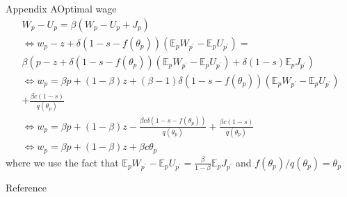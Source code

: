 \documentclass{beamer}
\begin{document}
\begin{frame}{Appendix A}{Optimal wage}\label{OptWage}
    \begin{gather*}
        W_p - U_p = \beta (W_p - U_p + J_p)\\
        \Leftrightarrow
        w_p - z + \delta (1-s-f(\theta_p))(\mathbb{E}_p W_{p^\prime}-\mathbb{E}_p U_{p^\prime}) =\\
        \beta (p-z+\delta (1-s-f(\theta_p))(\mathbb{E}_p W_{p^\prime}-\mathbb{E}_p U_{p^\prime}) +\delta(1-s)\mathbb{E}_p J_{p^\prime})\\
        \Leftrightarrow
        w_p = \beta p + (1-\beta)z + (\beta-1)\delta(1-s-f(\theta_p))(\mathbb{E}_p W_{p^\prime}-\mathbb{E}_p U_{p^\prime})\\
         + \frac{\beta c(1-s)}{q(\theta_p)}\\
        \Leftrightarrow
        w_p = \beta p + (1-\beta)z - \frac{\beta c\delta(1-s-f(\theta_p))}{q(\theta_p)} + \frac{\beta c(1-s)}{q(\theta_p)}\\
        \Leftrightarrow
        w_p = \beta p + (1-\beta)z + \beta c \theta_p
    \end{gather*}
    where we use the fact that \(\mathbb{E}_p W_{p^\prime}-\mathbb{E}_p U_{p^\prime} = \frac{\beta}{1-\beta}\mathbb{E}_p J_{p^\prime}\) and \(f(\theta_p)/q(\theta_p)=\theta_p\)
\end{frame}

\begin{frame}{Reference}
    \footnotesize
    

\end{frame}
\end{document}
